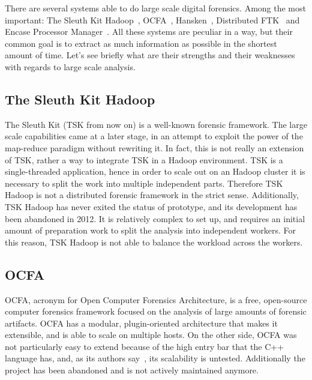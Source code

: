 \documentclass[twoside]{article}
\begin{document}
\begin{multicols}{2}
    There are several systems able to do large scale digital forensics. Among
    the most important: The Sleuth Kit Hadoop~\cite{tskhadoop}, OCFA~\cite{ocfa},
    Hansken~\cite{vanbeek2015}, Distributed FTK~\cite{ftk} and Encase
    Processor Manager~\cite{encaseprocessormanager}. All these systems are peculiar
    in a way, but their common goal is to extract as much information as possible
    in the shortest amount of time. Let's see briefly what are their strengths
    and their weaknesses with regards to large scale analysis.

    \subsection*{The Sleuth Kit Hadoop}
    The Sleuth Kit (TSK from now on) is a
    well-known forensic framework. The large scale
    capabilities came at a later stage, in an attempt to exploit the power of
    the map-reduce paradigm without rewriting it. In fact, this is not really an
    extension of TSK, rather a way to integrate TSK in a Hadoop environment.
    TSK is a single-threaded application, hence in order to scale out on an
    Hadoop cluster it is necessary to split the work into multiple independent
    parts. Therefore TSK Hadoop is not a distributed forensic framework in the
    strict sense.
    Additionally, TSK Hadoop has never exited the status of prototype, and its
    development has been abandoned in 2012. It is relatively complex to set up,
    and requires an initial amount of preparation work to
    split the analysis into independent workers. For this reason, TSK Hadoop is
    not able to balance the workload across the workers.

    \subsection*{OCFA}
    OCFA, acronym for Open Computer Forensics Architecture, is a free,
    open-source computer forensics framework focused on the analysis of large
    amounts of forensic artifacts. OCFA has a modular, plugin-oriented
    architecture that makes it extensible, and is able to scale on multiple
    hosts. On the other side, OCFA was not particularly easy to extend because
    of the high entry bar that the C++ language has, and, as its authors
    say~\cite{ocfa}, its scalability is untested. Additionally the project has
    been abandoned and is not actively maintained anymore.


\end{multicols}
\end{document}
